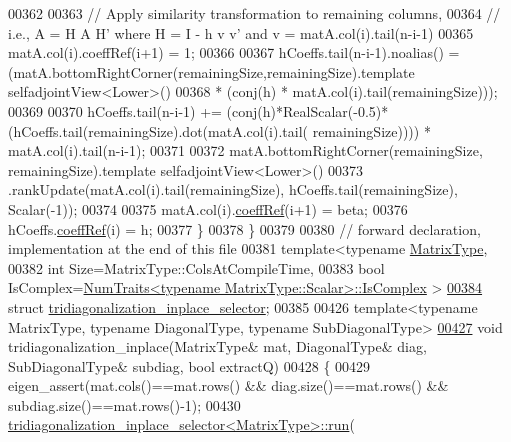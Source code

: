 \begin{DoxyCode}
00362 
00363     \textcolor{comment}{// Apply similarity transformation to remaining columns,}
00364     \textcolor{comment}{// i.e., A = H A H' where H = I - h v v' and v = matA.col(i).tail(n-i-1)}
00365     matA.col(i).coeffRef(i+1) = 1;
00366 
00367     hCoeffs.tail(n-i-1).noalias() = (matA.bottomRightCorner(remainingSize,remainingSize).template 
      selfadjointView<Lower>()
00368                                   * (conj(h) * matA.col(i).tail(remainingSize)));
00369 
00370     hCoeffs.tail(n-i-1) += (conj(h)*RealScalar(-0.5)*(hCoeffs.tail(remainingSize).dot(matA.col(i).tail(
      remainingSize)))) * matA.col(i).tail(n-i-1);
00371 
00372     matA.bottomRightCorner(remainingSize, remainingSize).template selfadjointView<Lower>()
00373       .rankUpdate(matA.col(i).tail(remainingSize), hCoeffs.tail(remainingSize), Scalar(-1));
00374 
00375     matA.col(i).\hyperlink{class_eigen_1_1_plain_object_base_a25626a55b26a4323565f79d1b7c48ea8}{coeffRef}(i+1) = beta;
00376     hCoeffs.\hyperlink{class_eigen_1_1_plain_object_base_a25626a55b26a4323565f79d1b7c48ea8}{coeffRef}(i) = h;
00377   \}
00378 \}
00379 
00380 \textcolor{comment}{// forward declaration, implementation at the end of this file}
00381 \textcolor{keyword}{template}<\textcolor{keyword}{typename} \hyperlink{group___eigenvalues___module_add0f4b2216d0ea8ee0f7d8525deaf0a9}{MatrixType},
00382          \textcolor{keywordtype}{int} Size=MatrixType::ColsAtCompileTime,
00383          \textcolor{keywordtype}{bool} IsComplex=\hyperlink{group___core___module_struct_eigen_1_1_num_traits}{NumTraits<typename MatrixType::Scalar>::IsComplex}
      >
\hyperlink{struct_eigen_1_1internal_1_1tridiagonalization__inplace__selector}{00384} \textcolor{keyword}{struct }\hyperlink{struct_eigen_1_1internal_1_1tridiagonalization__inplace__selector}{tridiagonalization\_inplace\_selector};
00385 
00426 \textcolor{keyword}{template}<\textcolor{keyword}{typename} MatrixType, \textcolor{keyword}{typename} DiagonalType, \textcolor{keyword}{typename} SubDiagonalType>
\hyperlink{namespace_eigen_1_1internal_aa53570cf2e676b41631f08397658ca0f}{00427} \textcolor{keywordtype}{void} tridiagonalization\_inplace(MatrixType& mat, DiagonalType& diag, SubDiagonalType& subdiag, \textcolor{keywordtype}{bool} 
      extractQ)
00428 \{
00429   eigen\_assert(mat.cols()==mat.rows() && diag.size()==mat.rows() && subdiag.size()==mat.rows()-1);
00430   \hyperlink{struct_eigen_1_1internal_1_1tridiagonalization__inplace__selector}{tridiagonalization\_inplace\_selector<MatrixType>::run}(

\end{DoxyCode}
